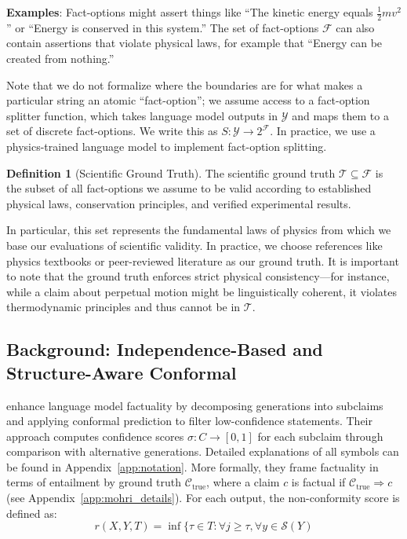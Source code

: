 \documentclass{uai2026} %
\theoremstyle{remark}
\theoremstyle{plain}
\theoremstyle{definition}
\newtheorem{definition}[theorem]{Definition}
\begin{document}
\textbf{Examples}: Fact-options might assert things like ``The kinetic energy equals $\frac{1}{2}mv^2$'' or ``Energy is conserved in this system.'' The set of fact-options $\mathcal{F}$ can also contain assertions that violate physical laws, for example that ``Energy can be created from nothing.''

Note that we do not formalize where the boundaries are for what makes a particular string an atomic ``fact-option''; we assume access to a fact-option splitter function, which takes language model outputs in $\mathcal{Y}$ and maps them to a set of discrete fact-options. We write this as $S : \mathcal{Y} \rightarrow 2^{\mathcal{F}}$. In practice, we use a physics-trained language model to implement fact-option splitting.

\begin{definition}[Scientific Ground Truth]
\label{def:ground-truth}
The scientific ground truth $\mathcal{T} \subseteq \mathcal{F}$ is the subset of all fact-options we assume to be valid according to established physical laws, conservation principles, and verified experimental results.
\end{definition}

In particular, this set represents the fundamental laws of physics from which we base our evaluations of scientific validity. In practice, we choose references like physics textbooks or peer-reviewed literature as our ground truth. It is important to note that the ground truth enforces strict physical consistency—for instance, while a claim about perpetual motion might be linguistically coherent, it violates thermodynamic principles and thus cannot be in $\mathcal{T}$.

\subsection{Background: Independence-Based and Structure-Aware Conformal}
\citet{mohri2024language} enhance language model factuality by decomposing generations into subclaims and applying conformal prediction to filter low-confidence statements. Their approach computes confidence scores $\sigma : C \rightarrow [0,1]$ for each subclaim through comparison with alternative generations. Detailed explanations of all symbols can be found in Appendix~\ref{app:notation}. 
More formally, they frame factuality in terms of entailment by ground truth $\mathcal{C}_{\text{true}}$, where a claim $c$ is factual if $\mathcal{C}_{\text{true}} \Rightarrow c$ (see Appendix~\ref{app:mohri_details}). For each output, the non-conformity score is defined as:
$$r(X,Y,T) = \inf\{\tau \in T : \forall j \geq \tau, \forall y \in \mathcal{S}(Y)$$
\end{document}

